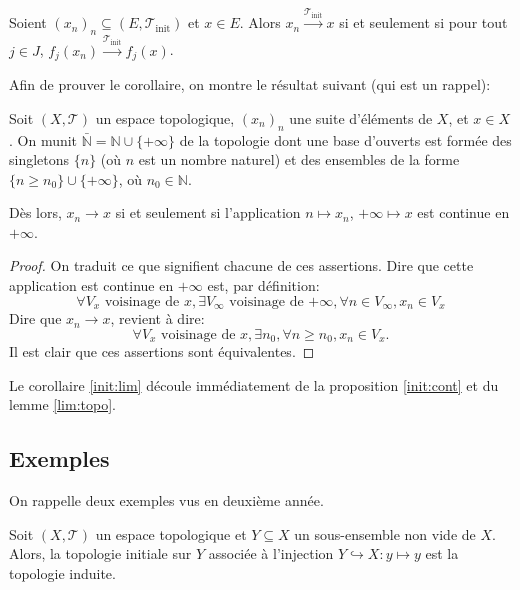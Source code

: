 \begin{cor}\label{init:lim}
  Soient $(x_n)_n\subseteq (E, \mathcal{T}_{\mathrm{init}})$ et $x\in E$.
  Alors $x_n\xrightarrow{\mathcal{T}_{\mathrm{init}}} x$ si et seulement
  si pour tout $j\in J$, $f_j(x_n)\xrightarrow{\mathcal{T}_{\mathrm{init}}} f_j(x)$.
\end{cor}

Afin de prouver le corollaire, on montre le résultat suivant (qui
est un rappel):
\begin{lem}\label{lim:topo}
  Soit $(X, \mathcal{T})$ un espace topologique, $(x_n)_n$ une
  suite d'éléments de $X$, et $x\in X$. On munit $\bar{\mathbb{N}}=%
  \mathbb{N}\cup\{+\infty\}$ de la topologie dont une base d'ouverts
  est formée des singletons $\{n\}$ (où $n$ est un nombre naturel)
  et des ensembles de la forme
  $\{n\geq n_0\}\cup\{+\infty\}$, où $n_0\in\mathbb N$.

  Dès lors, $x_n\to x$ si et seulement si l'application
  $n\mapsto x_n$, $+\infty\mapsto x$ est continue en $+\infty$.
\end{lem}

\begin{proof}
  On traduit ce que signifient chacune de ces assertions.
  Dire que cette application est continue en $+\infty$ est,
  par définition:
  \begin{equation*}
    \forall V_x\mbox{ voisinage de $x$},
    \exists V_\infty \mbox{ voisinage de $+\infty$},
    \forall n\in V_\infty, x_n\in V_x
  \end{equation*}
  Dire que $x_n\to x$, revient à dire:
  \begin{equation*}
    \forall V_x \mbox{ voisinage de $x$}, \exists n_0,
    \forall n\geq n_0, x_n\in V_x.
  \end{equation*}
  Il est clair que ces assertions sont équivalentes.
\end{proof}

Le corollaire \ref{init:lim} découle immédiatement de la proposition
\ref{init:cont} et du lemme \ref{lim:topo}.

\subsection*{Exemples}
On rappelle deux exemples vus en deuxième année.
\begin{ex}
  Soit $(X, \mathcal{T})$ un espace topologique et $Y\subseteq X$ un
  sous-ensemble non vide de $X$. Alors, la topologie initiale sur $Y$
  associée à l'injection $Y\hookrightarrow X: y\mapsto y$ est la topologie
  induite.
\end{ex}

